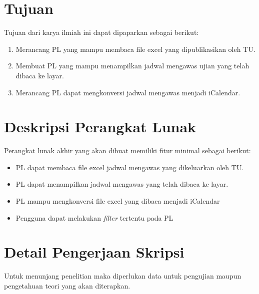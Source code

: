 \documentclass[a4paper,twoside]{article}
\begin{document}
\section{Tujuan}
Tujuan dari karya ilmiah ini dapat dipaparkan sebagai berikut:
\begin{enumerate}
	\item Merancang PL yang mampu membaca file excel yang dipublikasikan oleh TU.
	\item Membuat PL yang mampu menampilkan jadwal mengawas ujian yang telah dibaca ke layar.
	\item Merancang PL dapat mengkonversi jadwal mengawas menjadi iCalendar.
	
\end{enumerate}
\section{Deskripsi Perangkat Lunak}

Perangkat lunak akhir yang akan dibuat memiliki fitur minimal sebagai berikut:
\begin{itemize}
	\item PL dapat membaca file excel jadwal mengawas yang dikeluarkan oleh TU.
	\item PL dapat menampilkan jadwal mengawas yang telah dibaca ke layar. 
	\item PL mampu mengkonversi file excel yang dibaca menjadi iCalendar
	\item Pengguna dapat melakukan \textit{filter} tertentu pada PL
\end{itemize}

\section{Detail Pengerjaan Skripsi}
Untuk menunjang penelitian maka diperlukan data untuk pengujian maupun pengetahuan teori yang akan diterapkan.
\end{document}
